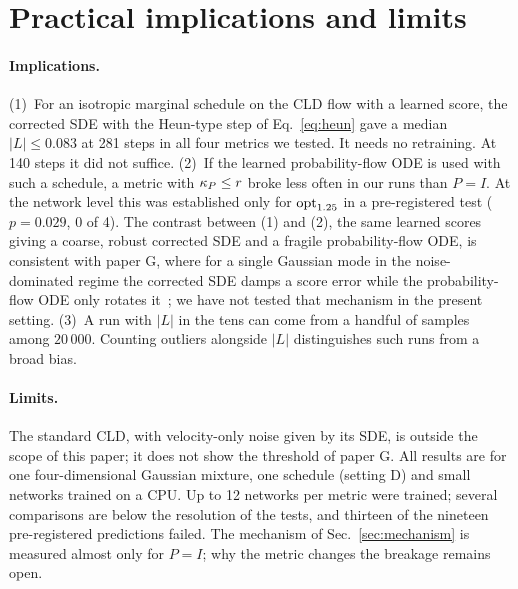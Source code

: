 \section{Practical implications and limits}
\label{sec:discussion}

\paragraph*{Implications.}
(1)~For an isotropic marginal schedule on the CLD flow with a learned score, the corrected SDE \Sb{} with the Heun-type step of Eq.~\eqref{eq:heun} gave a median $|L|\leq0.083$ at 281 steps in all four metrics we tested.
It needs no retraining.
At 140 steps it did not suffice.
(2)~If the learned probability-flow ODE is used with such a schedule, a metric with $\kappa_P\leq r$ broke less often in our runs than $P=I$.
At the network level this was established only for $\mathrm{opt}_{1.25}$ in a pre-registered test ($p=0.029$, 0 of 4).
The contrast between (1) and (2), the same learned scores giving a coarse, robust corrected SDE and a fragile probability-flow ODE, is consistent with paper G, where for a single Gaussian mode in the noise-dominated regime the corrected SDE damps a score error while the probability-flow ODE only rotates it~\cite{namba2026paperG}; we have not tested that mechanism in the present setting.
(3)~A run with $|L|$ in the tens can come from a handful of samples among $20\,000$.
Counting outliers alongside $|L|$ distinguishes such runs from a broad bias.

\paragraph*{Limits.}
The standard CLD, with velocity-only noise given by its SDE, is outside the scope of this paper; it does not show the threshold of paper G.
All results are for one four-dimensional Gaussian mixture, one schedule (setting D) and small networks trained on a CPU.
Up to 12 networks per metric were trained; several comparisons are below the resolution of the tests, and thirteen of the nineteen pre-registered predictions failed.
The mechanism of Sec.~\ref{sec:mechanism} is measured almost only for $P=I$; why the metric changes the breakage remains open.
